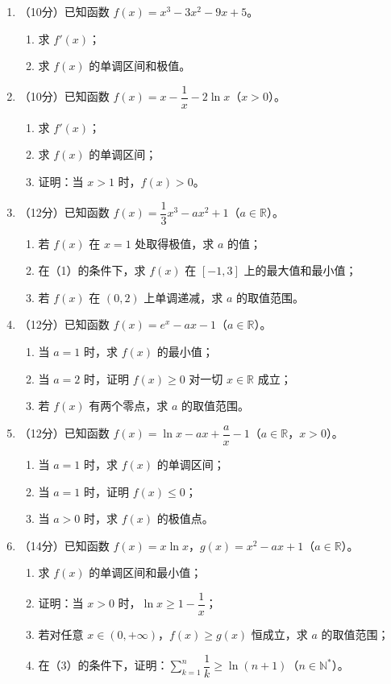 \documentclass[12pt, a4paper]{ctexart}
\begin{document}
\begin{enumerate}[resume]
\item （10分）已知函数 $f(x)=x^3-3x^2-9x+5$。
\begin{enumerate}[label=(\arabic*)]
\item 求 $f'(x)$；
\item 求 $f(x)$ 的单调区间和极值。
\end{enumerate}

\item （10分）已知函数 $f(x)=x-\dfrac{1}{x}-2\ln x$（$x>0$）。
\begin{enumerate}[label=(\arabic*)]
\item 求 $f'(x)$；
\item 求 $f(x)$ 的单调区间；
\item 证明：当 $x>1$ 时，$f(x)>0$。
\end{enumerate}

\item （12分）已知函数 $f(x)=\dfrac{1}{3}x^3-ax^2+1$（$a\in\mathbb{R}$）。
\begin{enumerate}[label=(\arabic*)]
\item 若 $f(x)$ 在 $x=1$ 处取得极值，求 $a$ 的值；
\item 在（1）的条件下，求 $f(x)$ 在 $[-1,3]$ 上的最大值和最小值；
\item 若 $f(x)$ 在 $(0,2)$ 上单调递减，求 $a$ 的取值范围。
\end{enumerate}

\item （12分）已知函数 $f(x)=e^x-ax-1$（$a\in\mathbb{R}$）。
\begin{enumerate}[label=(\arabic*)]
\item 当 $a=1$ 时，求 $f(x)$ 的最小值；
\item 当 $a=2$ 时，证明 $f(x)\geq 0$ 对一切 $x\in\mathbb{R}$ 成立；
\item 若 $f(x)$ 有两个零点，求 $a$ 的取值范围。
\end{enumerate}

\item （12分）已知函数 $f(x)=\ln x-ax+\dfrac{a}{x}-1$（$a\in\mathbb{R}$，$x>0$）。
\begin{enumerate}[label=(\arabic*)]
\item 当 $a=1$ 时，求 $f(x)$ 的单调区间；
\item 当 $a=1$ 时，证明 $f(x)\leq 0$；
\item 当 $a>0$ 时，求 $f(x)$ 的极值点。
\end{enumerate}

\item （14分）已知函数 $f(x)=x\ln x$，$g(x)=x^2-ax+1$（$a\in\mathbb{R}$）。
\begin{enumerate}[label=(\arabic*)]
\item 求 $f(x)$ 的单调区间和最小值；
\item 证明：当 $x>0$ 时，$\ln x\geq 1-\dfrac{1}{x}$；
\item 若对任意 $x\in(0,+\infty)$，$f(x)\geq g(x)$ 恒成立，求 $a$ 的取值范围；
\item 在（3）的条件下，证明：$\displaystyle\sum_{k=1}^{n}\dfrac{1}{k}\geq\ln(n+1)$（$n\in\mathbb{N}^*$）。
\end{enumerate}
\end{enumerate}
\end{document}
